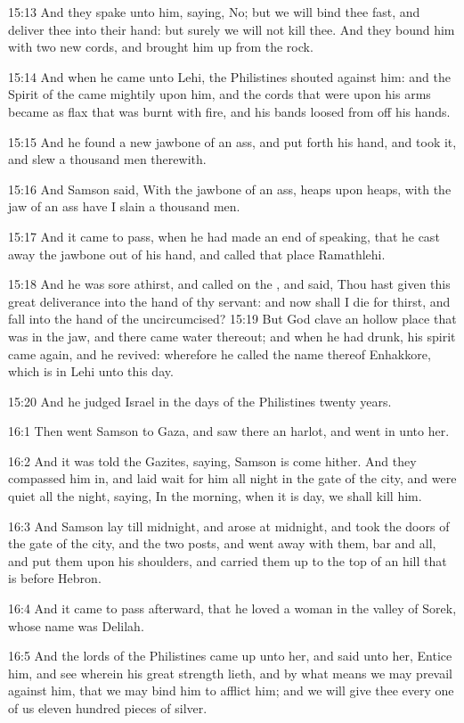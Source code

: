 15:13 And they spake unto him, saying, No; but we will bind thee fast,
and deliver thee into their hand: but surely we will not kill thee.
And they bound him with two new cords, and brought him up from the
rock.

15:14 And when he came unto Lehi, the Philistines shouted against him:
and the Spirit of the \LORD came mightily upon him, and the cords that
were upon his arms became as flax that was burnt with fire, and his
bands loosed from off his hands.

15:15 And he found a new jawbone of an ass, and put forth his hand,
and took it, and slew a thousand men therewith.

15:16 And Samson said, With the jawbone of an ass, heaps upon heaps,
with the jaw of an ass have I slain a thousand men.

15:17 And it came to pass, when he had made an end of speaking, that
he cast away the jawbone out of his hand, and called that place
Ramathlehi.

15:18 And he was sore athirst, and called on the \LORD, and said, Thou
hast given this great deliverance into the hand of thy servant: and
now shall I die for thirst, and fall into the hand of the
uncircumcised?  15:19 But God clave an hollow place that was in the
jaw, and there came water thereout; and when he had drunk, his spirit
came again, and he revived: wherefore he called the name thereof
Enhakkore, which is in Lehi unto this day.

15:20 And he judged Israel in the days of the Philistines twenty
years.

16:1 Then went Samson to Gaza, and saw there an harlot, and went in
unto her.

16:2 And it was told the Gazites, saying, Samson is come hither. And
they compassed him in, and laid wait for him all night in the gate of
the city, and were quiet all the night, saying, In the morning, when
it is day, we shall kill him.

16:3 And Samson lay till midnight, and arose at midnight, and took the
doors of the gate of the city, and the two posts, and went away with
them, bar and all, and put them upon his shoulders, and carried them
up to the top of an hill that is before Hebron.

16:4 And it came to pass afterward, that he loved a woman in the
valley of Sorek, whose name was Delilah.

16:5 And the lords of the Philistines came up unto her, and said unto
her, Entice him, and see wherein his great strength lieth, and by what
means we may prevail against him, that we may bind him to afflict him;
and we will give thee every one of us eleven hundred pieces of silver.

